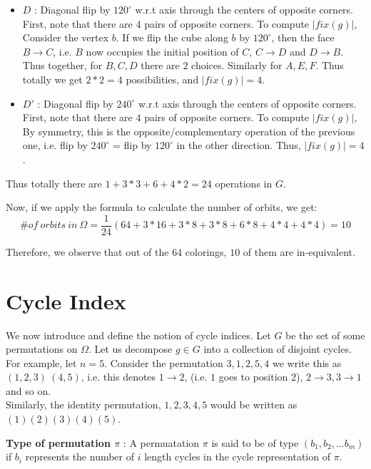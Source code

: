 \begin{itemize}
\item $D$ : Diagonal flip by $120^{\circ}$ w.r.t axis through the centers of opposite corners. First, note that there are $4$ pairs of opposite corners. To compute $|fix(g)|$,
\\
Consider the vertex $b$. If we flip the cube along $b$ by $120^{\circ}$, then the face $B \rightarrow C$, i.e. $B$ now occupies the initial position of $C$, $C \rightarrow D$ and $D \rightarrow B$. Thus together, for $B, C, D$ there are $2$ choices. Similarly for $A, E, F$. Thus totally we get $2*2 = 4$ possibilities, and $|fix(g)| = 4$.

\item $D'$ : Diagonal flip by $240^{\circ}$ w.r.t axis through the centers of opposite corners. First, note that there are $4$ pairs of opposite corners. To compute $|fix(g)|$,
\\
By symmetry, this is the opposite/complementary operation of the previous one, i.e. flip by $240^{\circ}$ = flip by $120^{\circ}$ in the other direction. Thus, $|fix(g)| = 4$.
\end{itemize}

Thus totally there are $1 + 3*3 + 6 + 4*2 = 24$ operations in $G$.

Now, if we apply the formula to calculate the number of orbits, we get:
$$\#of \ orbits \ in \ \Omega =\frac{1}{24}(64 + 3*16 + 3*8 + 3*8 + 6*8 + 4*4 + 4*4) = 10$$

Therefore, we observe that out of the $64$ colorings, $10$ of them are in-equivalent.

\section{Cycle Index}
We now introduce and define the notion of cycle indices. Let $G$ be the set of some permutations on $\Omega$. Let us decompose $g \in G$ into a collection of disjoint cycles. 
\\
For example, let $n = 5$. Consider the permutation $3, 1, 2, 5, 4$ we write this as $(1, 2, 3)\ (4, 5)$, i.e. this denotes $1 \rightarrow 2$, (i.e. $1$ goes to position $2$), $2 \rightarrow 3, 3 \rightarrow 1$ and so on. 
\\
Similarly, the identity permutation, $1, 2, 3, 4, 5$ would be written as $(1)(2)(3)(4)(5)$.
\begin{definition}
\textbf{Type of permutation $\pi$} : A permuatation $\pi$ is said to be of type $(b_1, b_2, \ldots b_m)$ if $b_i$ represents the number of $i$ length cycles in the cycle representation of $\pi$.
\end{definition}

